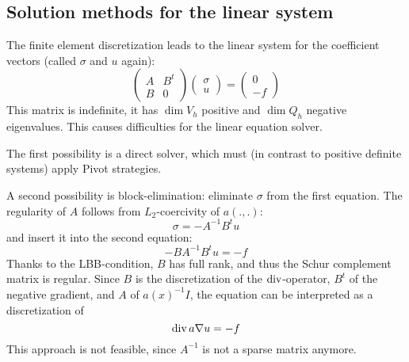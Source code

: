 \subsection{Solution methods for the linear system}
%
The finite element discretization leads to the linear system for the
coefficient vectors (called $\sigma$ and $u$ again):
$$
\left( \begin{array}{cc}
  A & B^t \\ B & 0 
\end{array} \right) 
\left( \begin{array}{cc}
         \sigma \\ u 
\end{array} \right) 
=
\left( \begin{array}{cc}
         0 \\ -f
\end{array} \right) 
$$
This matrix is indefinite, it has $\dim V_h$ positive and $\dim Q_h$
negative eigenvalues. This causes difficulties for the linear equation
solver. 

The first possibility is a direct solver, which must (in
contrast to positive definite systems) apply Pivot strategies. 

A second possibility is block-elimination: eliminate $\sigma$ from the
first equation. The regularity of $A$ follows from $L_2$-coercivity of $a(.,.)$:
$$
\sigma = -A^{-1}B^t u 
$$
and insert it into the second equation:
$$
- B A^{-1} B^t u = -f
$$
Thanks to the LBB-condition, $B$ has full rank, and thus the Schur complement 
matrix is regular. Since $B$ is the discretization of the $\operatorname{div}$-operator,
$B^t$ of the negative gradient, and $A$ of $a(x)^{-1} I$, the equation can be
interpreted as a discretization of 
$$
\operatorname{div} a \nabla u = -f
$$
This approach is not feasible, since $A^{-1}$ is not a sparse matrix
anymore.

